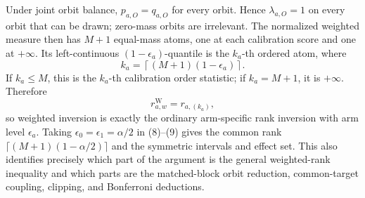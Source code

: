 Under joint orbit balance, \(p_{a,O}=q_{a,O}\) for every orbit. Hence \(\lambda_{a,O}=1\) on every orbit that can be drawn; zero-mass orbits are irrelevant. The normalized weighted measure then has \(M+1\) equal-mass atoms, one at each calibration score and one at \(+\infty\). Its left-continuous \((1-\epsilon_a)\)-quantile is the \(k_a\)-th ordered atom, where
\[
k_a=\left\lceil(M+1)(1-\epsilon_a)\right\rceil.
\tag{8}
\]
If \(k_a\le M\), this is the \(k_a\)-th calibration order statistic; if \(k_a=M+1\), it is \(+\infty\). Therefore
\[
r^{\mathrm W}_{a,w}=r_{a,(k_a)},
\tag{9}
\]
so weighted inversion is exactly the ordinary arm-specific rank inversion with arm level \(\epsilon_a\). Taking \(\epsilon_0=\epsilon_1=\alpha/2\) in (8)--(9) gives the common rank \(\lceil(M+1)(1-\alpha/2)\rceil\) and the symmetric intervals and effect set. This also identifies precisely which part of the argument is the general weighted-rank inequality and which parts are the matched-block orbit reduction, common-target coupling, clipping, and Bonferroni deductions.